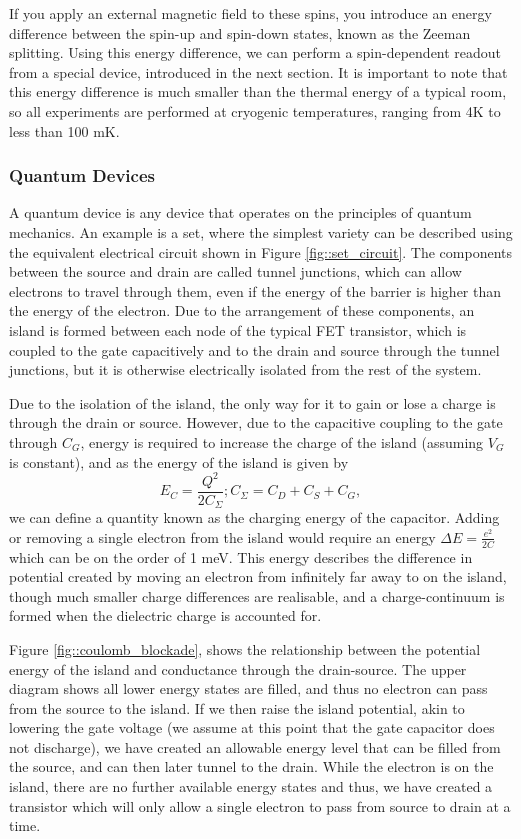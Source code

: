 	\label{zeeman}
	If you apply an external magnetic field to these spins, you introduce an energy difference between the spin-up and spin-down states, known as the Zeeman splitting. Using this energy difference, we can perform a spin-dependent readout from a special device, introduced in the next section. It is important to note that this energy difference is much smaller than the thermal energy of a typical room, so all experiments are performed at cryogenic temperatures, ranging from 4K to less than 100 mK. \cite{morello2010single}
	
\subsubsection{Quantum Devices}
	\label{sec::set}
	A quantum device is any device that operates on the principles of quantum mechanics. An example is a \gls{set}, where the simplest variety can be described using the equivalent electrical circuit \cite{devoret2000amplifying} shown in Figure \ref{fig::set_circuit}. The components between the source and drain are called tunnel junctions, which can allow electrons to travel through them, even if the energy of the barrier is higher than the energy of the electron. Due to the arrangement of these components, an island is formed between each node of the typical FET transistor, which is coupled to the gate capacitively and to the drain and source through the tunnel junctions, but it is otherwise electrically isolated from the rest of the system.
	
	Due to the isolation of the island, the only way for it to gain or lose a charge is through the drain or source. However, due to the capacitive coupling to the gate through $C_G$, energy is required to increase the charge of the island (assuming $V_G$ is constant), and as the energy of the island is given by $$E_C = \frac{Q^2}{2 C_\Sigma} ; C_\Sigma = C_D + C_S + C_G,$$ we can define a quantity known as the charging energy of the capacitor. Adding or removing a single electron from the island would require an energy $\Delta E = \frac{e^2}{2 C}$ which can be on the order of 1 meV. This energy describes the difference in potential created by moving an electron from infinitely far away to on the island, though much smaller charge differences are realisable, and a charge-continuum is formed when the dielectric charge is accounted for.
	
	
	
	
	
	Figure \ref{fig::coulomb_blockade}, shows the relationship between the potential energy of the island and conductance through the drain-source. The upper diagram shows all lower energy states are filled, and thus no electron can pass from the source to the island. If we then raise the island potential, akin to lowering the gate voltage
	 (we assume at this point that the gate capacitor does not discharge), 
	 we have created an allowable energy level that can be filled from the source, and can then later tunnel to the drain. While the electron is on the island, there are no further available energy states and thus, we have created a transistor which will only allow a single electron to pass from source to drain at a time.
	
